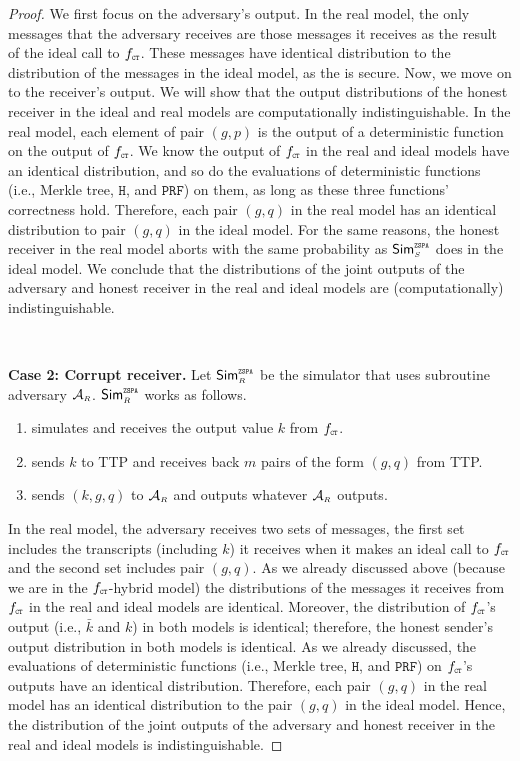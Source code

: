 \begin{proof}
 We first focus on the adversary’s output. In the real model, the only messages that the adversary receives are those messages it receives as the result of the ideal call to $f_{\scriptscriptstyle \mathtt{CT}}$. These messages have identical distribution to the distribution of the messages in the ideal model, as the \ct is secure. Now, we move on to the receiver’s output. We will show that the output distributions of the honest receiver in the ideal and real models are computationally indistinguishable. In the real model,  each element of pair $(g, p)$ is the output of a deterministic function on the output of $f_{\scriptscriptstyle \mathtt{CT}}$. We know the output of $f_{\scriptscriptstyle \mathtt{CT}}$ in the real and ideal models have an identical distribution, and so do the evaluations of deterministic functions (i.e., Merkle tree, $\mathtt{H}$, and $\mathtt{PRF}$) on them, as long as these three functions' correctness hold. Therefore, each pair $(g,q)$ in the real model has an identical distribution to pair $(g,  q)$ in the ideal model.  For the same reasons, the honest receiver in the real model aborts with the same probability as  $\mathsf{Sim}^{\scriptscriptstyle \mathtt{ZSPA}}_{\scriptscriptstyle S}$ does in the ideal model.  We conclude that the distributions of the joint outputs of the adversary and honest receiver in the real and ideal models are  (computationally) indistinguishable. 


\

\noindent\textbf{Case 2: Corrupt receiver.}   Let $\mathsf{Sim}^{\scriptscriptstyle \mathtt{ZSPA}}_{\scriptscriptstyle R}$ be the simulator that uses subroutine adversary $\mathcal{A}_{\scriptscriptstyle R}$. $\mathsf{Sim}^{\scriptscriptstyle \mathtt{ZSPA}}_{\scriptscriptstyle R}$ works as follows. 

\begin{enumerate}
%
\item simulates   \ct  and receives the output value $ k$ from $f_{\scriptscriptstyle \mathtt{CT}}$.
%
\item sends $ k$ to TTP and receives back $m$ pairs of the form $( g,  q)$ from TTP. 
%
\item sends $( k,  g,  q)$ to $\mathcal{A}_{\scriptscriptstyle R}$ and outputs whatever  $\mathcal{A}_{\scriptscriptstyle R}$ outputs. 
%
 \end{enumerate}
 
 
In the real model, the adversary receives two sets of messages, the first set includes the transcripts (including $ k$) it receives when it makes an ideal call to $f_{\scriptscriptstyle \mathtt{CT}}$ and the second set includes pair $(g, q)$. As we already discussed above (because we are in the  $f_{\scriptscriptstyle \mathtt{CT}}$-hybrid model) the distributions of the messages it receives from $f_{\scriptscriptstyle \mathtt{CT}}$ in the real and ideal models are identical. Moreover, the distribution of $f_{\scriptscriptstyle \mathtt{CT}}$'s output (i.e., $\bar k$ and $k$) in both models is identical; therefore, the honest sender's output distribution in both models is identical. As we already discussed,  the evaluations of deterministic functions (i.e., Merkle tree, $\mathtt{H}$, and $\mathtt{PRF}$) on $f_{\scriptscriptstyle \mathtt{CT}}$'s outputs have an identical distribution. Therefore, each pair $(g, q)$ in the real model has an identical distribution to the pair $(g, q)$ in the ideal model.  Hence, the distribution of the joint outputs of the adversary and honest receiver in the real and ideal models is indistinguishable.
%
\end{proof}

